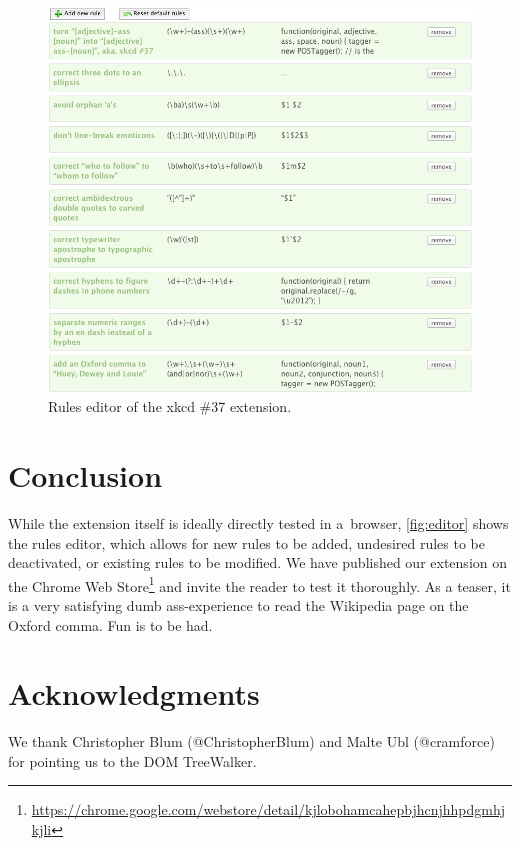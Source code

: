 \documentclass{acm_proc_article-sp}
\newcommand{\inlinelistingsize}{\fontsize{8pt}{11pt}}
\let\oldttdefault\ttdefault
\renewcommand{\ttdefault}{pcr}
\let\oldurl\url
\renewcommand{\url}[1]{\inlinelistingsize\oldurl{#1}}
\begin{document}
\begin{figure}[h!]
\vspace{+10pt}
\begin{center}
   \includegraphics[width=1\linewidth]{./editor.png}
\end{center}
   \caption{Rules editor of the xkcd \#37 extension.}
\label{fig:editor}
\end{figure}

\section{Conclusion}
While the extension itself is ideally directly tested in a~browser, \autoref{fig:editor} shows the rules editor,
which allows for new rules to be added, undesired rules to be deactivated, or existing rules to be modified.
We have published our extension on the Chrome Web Store\footnote{\url{https://chrome.google.com/webstore/detail/kjlobohamcahepbjhcnjhhpdgmhjkjli}} and invite the reader to test it thoroughly.
As a teaser, it is a very satisfying dumb ass-experience to read the Wikipedia page on the Oxford comma.
Fun is to be had.

\section{Acknowledgments}
We thank Christopher Blum (@ChristopherBlum) and Malte Ubl (@cramforce) for pointing us to the DOM TreeWalker.

\let\ttdefault\oldttdefault
\let\url\oldurl




\balancecolumns
\end{document}
